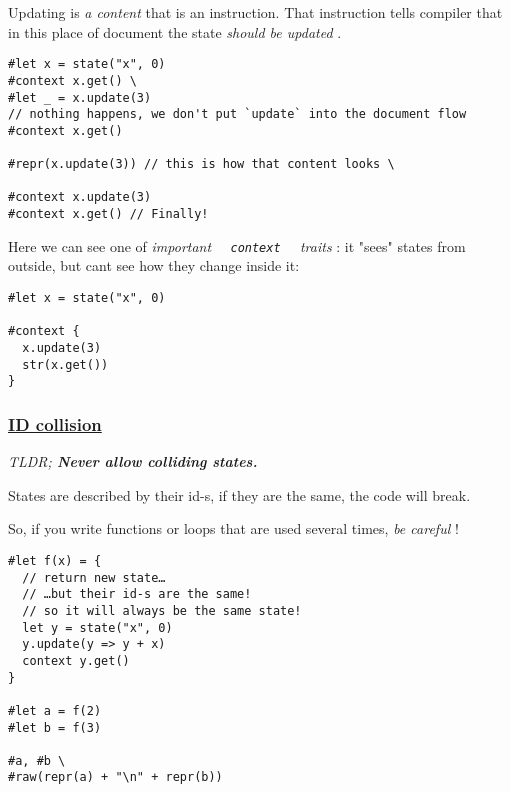 Updating is \emph{a content} that is an instruction. That instruction
tells compiler that in this place of document the state \emph{should be
updated} .

\begin{verbatim}
#let x = state("x", 0)
#context x.get() \
#let _ = x.update(3)
// nothing happens, we don't put `update` into the document flow
#context x.get()

#repr(x.update(3)) // this is how that content looks \

#context x.update(3)
#context x.get() // Finally!
\end{verbatim}

\pandocbounded{}

Here we can see one of \emph{important
\texttt{\ }{\texttt{\ context\ }}\texttt{\ } traits} : it "sees" states
from outside, but can\textquotesingle t see how they change inside it:

\begin{verbatim}
#let x = state("x", 0)

#context {
  x.update(3)
  str(x.get())
}
\end{verbatim}

\pandocbounded{}

\subsubsection{\texorpdfstring{\hyperref[id-collision]{ID
collision}}{ID collision}}\label{id-collision}

\emph{TLDR; \textbf{Never allow colliding states.}}

States are described by their id-s, if they are the same, the code will
break.

So, if you write functions or loops that are used several times,
\emph{be careful} !

\begin{verbatim}
#let f(x) = {
  // return new state…
  // …but their id-s are the same!
  // so it will always be the same state!
  let y = state("x", 0)
  y.update(y => y + x)
  context y.get()
}

#let a = f(2)
#let b = f(3)

#a, #b \
#raw(repr(a) + "\n" + repr(b))
\end{verbatim}

